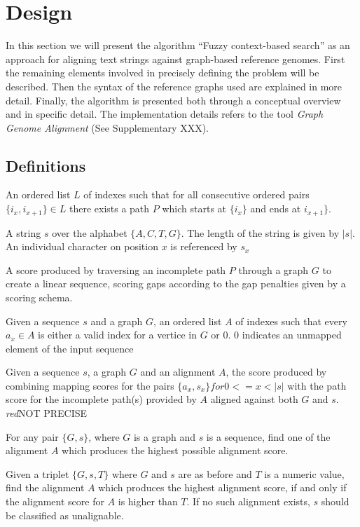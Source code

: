 \documentclass{article}
\begin{document}
\chapter{Design}
In this section we will present the algorithm ``Fuzzy context-based search'' as an approach for aligning text strings against graph-based reference genomes. First the remaining elements involved in precisely defining the problem will be described. Then the syntax of the reference graphs used are explained in more detail. Finally, the algorithm is presented both through a conceptual overview and in specific detail. The implementation details refers to the tool \textit{Graph Genome Alignment} (See Supplementary XXX).
\section{Definitions}
\begin{defn}
  An ordered list $L$ of indexes such that for all consecutive ordered pairs $\{i_x, i_{x+1}\} \in L$ there exists a path $P$ which starts at $\{i_x\}$ and ends at $i_{x+1}\}$.
\end{defn}
\begin{defn}
  A string $s$ over the alphabet $\{A, C, T, G\}$. The length of the string is given by $|s|$. An individual character on position $x$ is referenced by $s_x$
\end{defn}
\begin{defn}
  A score produced by traversing an incomplete path $P$ through a graph $G$ to create a linear sequence, scoring gaps according to the gap penalties given by a scoring schema.
\end{defn}
\begin{defn}[Alignment]
  Given a sequence $s$ and a graph $G$, an ordered list $A$ of indexes such that every $a_x \in A$ is either a valid index for a vertice in $G$ or $0$. $0$ indicates an unmapped element of the input sequence
\end{defn}
\begin{defn}
  Given a sequence $s$, a graph $G$ and an alignment $A$, the score produced by combining mapping scores for the pairs $\{a_x, s_x\} for 0<=x<|s|$ with the path score for the incomplete path(s) provided by $A$ aligned against both $G$ and $s$. \textit{red}{NOT PRECISE}
\end{defn}
\begin{defn}
  For any pair $\{G, s\}$, where $G$ is a graph and $s$ is a sequence, find one of the alignment $A$ which produces the highest possible alignment score.
\end{defn}
\begin{defn}
  \label{def:bounded_alignment_problem}
  Given a triplet $\{G, s, T\}$ where $G$ and $s$ are as before and $T$ is a numeric value, find the alignment $A$ which produces the highest alignment score, if and only if the alignment score for $A$ is higher than $T$. If no such alignment exists, $s$ should be classified as unalignable.
\end{defn}
\end{document}
